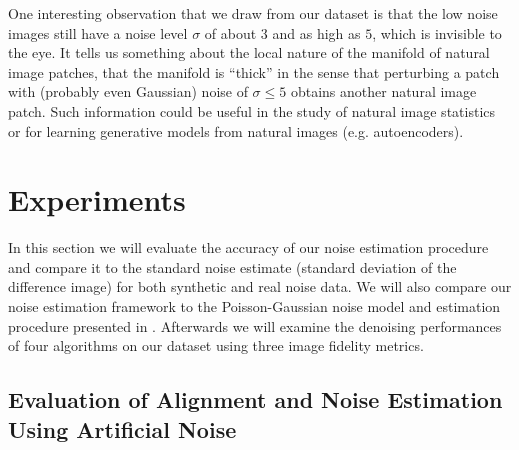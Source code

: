 \documentclass[review]{elsarticle}
\begin{document}
One interesting observation that we draw from our dataset is that the low noise images still have a noise level $\sigma$ of about $3$ and as high as $5$, which is invisible to the eye. It tells us something about the local nature of the manifold of natural image patches, that the manifold is ``thick'' in the sense that perturbing a patch with (probably even Gaussian) noise of $\sigma\leq 5$ obtains another natural image patch. Such information could be useful in the study of natural image statistics or for learning generative models from natural images (e.g. autoencoders).

\section{Experiments}

In this section we will evaluate the accuracy of our noise estimation procedure and compare it to the standard noise estimate (standard deviation of the difference image) for both synthetic and real noise data. We will also compare our noise estimation framework to the Poisson-Gaussian noise model and estimation procedure presented in \cite{Foi-Poisson}. Afterwards we will examine the denoising performances of four algorithms on our dataset using three image fidelity metrics.
 
\subsection{Evaluation of Alignment and Noise Estimation Using Artificial Noise} \label{subsec:noiseeval}
\end{document}
